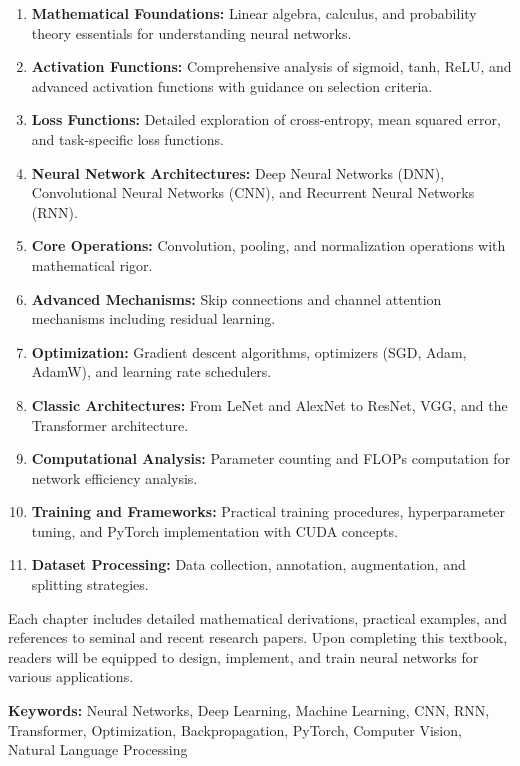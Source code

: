 \begin{enumerate}
    \item \textbf{Mathematical Foundations:} Linear algebra, calculus, and probability theory essentials for understanding neural networks.
    
    \item \textbf{Activation Functions:} Comprehensive analysis of sigmoid, tanh, ReLU, and advanced activation functions with guidance on selection criteria.
    
    \item \textbf{Loss Functions:} Detailed exploration of cross-entropy, mean squared error, and task-specific loss functions.
    
    \item \textbf{Neural Network Architectures:} Deep Neural Networks (DNN), Convolutional Neural Networks (CNN), and Recurrent Neural Networks (RNN).
    
    \item \textbf{Core Operations:} Convolution, pooling, and normalization operations with mathematical rigor.
    
    \item \textbf{Advanced Mechanisms:} Skip connections and channel attention mechanisms including residual learning.
    
    \item \textbf{Optimization:} Gradient descent algorithms, optimizers (SGD, Adam, AdamW), and learning rate schedulers.
    
    \item \textbf{Classic Architectures:} From LeNet and AlexNet to ResNet, VGG, and the Transformer architecture.
    
    \item \textbf{Computational Analysis:} Parameter counting and FLOPs computation for network efficiency analysis.
    
    \item \textbf{Training and Frameworks:} Practical training procedures, hyperparameter tuning, and PyTorch implementation with CUDA concepts.
    
    \item \textbf{Dataset Processing:} Data collection, annotation, augmentation, and splitting strategies.
\end{enumerate}

Each chapter includes detailed mathematical derivations, practical examples, and references to seminal and recent research papers. Upon completing this textbook, readers will be equipped to design, implement, and train neural networks for various applications.

\vspace{2cm}

\textbf{Keywords:} Neural Networks, Deep Learning, Machine Learning, CNN, RNN, Transformer, Optimization, Backpropagation, PyTorch, Computer Vision, Natural Language Processing

\newpage
